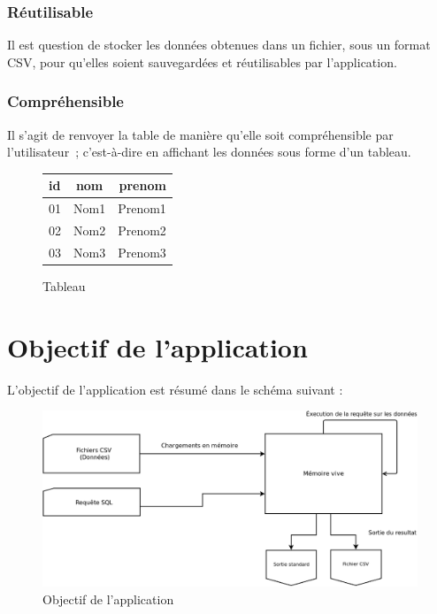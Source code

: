 \documentclass[oneside,13pt,a4paper]{report}
\begin{document}
\subsubsection{Réutilisable}

Il est question de stocker les données obtenues dans un fichier, sous un format CSV, pour qu'elles soient sauvegardées et réutilisables par l'application.

\pagebreak

\subsubsection{Compréhensible}

Il s'agit de renvoyer la table de manière qu'elle soit compréhensible par l'utilisateur ; c'est-à-dire en affichant les données sous forme d'un tableau.

\begin{figure}[h!]
	\centering
	\caption{Tableau}
	\vspace{0.1cm}
	\begin{tabular}{|l|c|r|}
		\hline
		id & nom  & prenom
		\\
		\hline
		01 & Nom1 & Prenom1 \\
		02 & Nom2 & Prenom2 \\
		03 & Nom3 & Prenom3 \\
		\hline
	\end{tabular}
\end{figure}

\section{Objectif de l'application}

L'objectif de l'application est résumé dans le schéma suivant :
\begin{figure}[!h]
	\centering
	\includegraphics[width=1\textwidth]{img/role_prog.png}
	\vspace{0.1cm}
	\caption{Objectif de l'application}
\end{figure}
\end{document}
